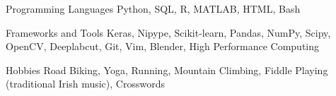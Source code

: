 

\begin{cvskills}

 \cvskill
  	{Programming Languages}
    {Python, SQL, R, MATLAB, HTML, Bash} %
  
 \cvskill
   {Frameworks and Tools}
   {Keras, Nipype, Scikit-learn, Pandas, NumPy, Scipy, OpenCV, Deeplabcut, Git, Vim, Blender, High Performance Computing}
   
 \cvskill
   {Hobbies}
   {Road Biking, Yoga, Running, Mountain Climbing, Fiddle Playing (traditional Irish music), Crosswords}
    

\end{cvskills}
